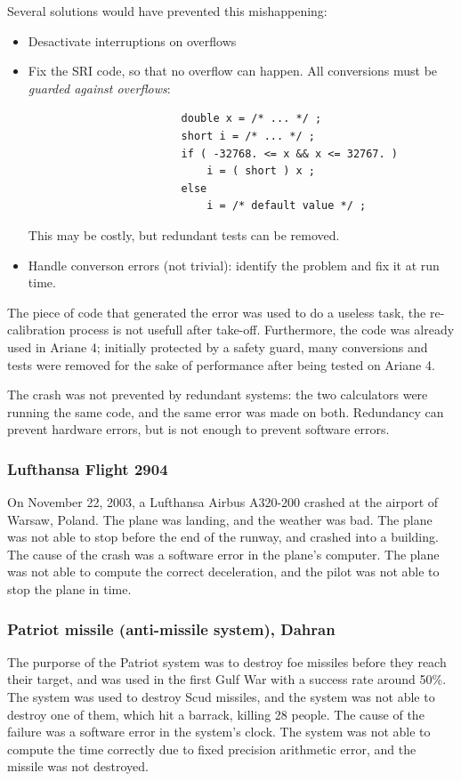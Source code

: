 \documentclass[toc]{../cs-classes/cs-classes}
\begin{document}
Several solutions would have prevented this mishappening:
\begin{itemize}
    \item Desactivate interruptions on overflows
    \item Fix the SRI code, so that no overflow can happen. All conversions must be \emph{guarded against overflows}:
    \begin{verbatim}
                        double x = /* ... */ ;
                        short i = /* ... */ ;
                        if ( -32768. <= x && x <= 32767. )
                            i = ( short ) x ;
                        else
                            i = /* default value */ ;
    \end{verbatim}
    This may be costly, but redundant tests can be removed.
    \item Handle converson errors (not trivial): identify the problem and fix it at run time.
\end{itemize}

The piece of code that generated the error was used to do a useless task, the re-calibration process is not usefull after take-off. Furthermore, the code was already used in Ariane 4; initially protected by a safety guard, many conversions and tests were removed for the sake of performance after being tested on Ariane 4.

The crash was not prevented by redundant systems: the two calculators were running the same code, and the same error was made on both. Redundancy can prevent hardware errors, but is not enough to prevent software errors.

\subsubsection{Lufthansa Flight 2904}
On November 22, 2003, a Lufthansa Airbus A320-200 crashed at the airport of Warsaw, Poland. The plane was landing, and the weather was bad. The plane was not able to stop before the end of the runway, and crashed into a building. The cause of the crash was a software error in the plane's computer. The plane was not able to compute the correct deceleration, and the pilot was not able to stop the plane in time.

\subsubsection{Patriot missile (anti-missile system), Dahran}
The purporse of the Patriot system was to destroy foe missiles before they reach their target, and was used in the first Gulf War with a success rate around 50\%. The system was used to destroy Scud missiles, and the system was not able to destroy one of them, which hit a barrack, killing 28 people. The cause of the failure was a software error in the system's clock. The system was not able to compute the time correctly due to fixed precision arithmetic error, and the missile was not destroyed.
\end{document}

